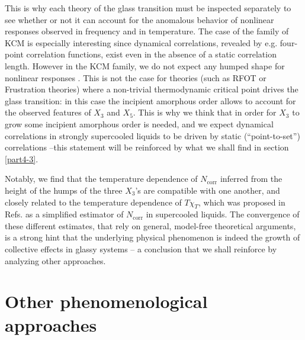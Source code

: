 \documentclass[single column,pre]{revtex4}
\begin{document}
This is why each theory of the glass transition must be inspected separately \cite{Alb16} to see whether or not it can account for the anomalous behavior of nonlinear responses observed in frequency and in temperature. The case of the family of KCM  is especially interesting since dynamical correlations, revealed by e.g. four-point correlation functions, exist even in the absence of a static correlation length. However in the KCM family, we do not expect any humped shape for nonlinear responses \cite{Alb16}. This is not the case for theories (such as RFOT or Frustration theories) where a non-trivial thermodynamic critical point drives the glass transition: in this case the incipient amorphous order allows to account \cite{Alb16} for the observed features of $X_3$ and $X_5$. This is why we think that in order for $X_3$ to grow some incipient amorphous order is needed, and we expect dynamical correlations in strongly supercooled liquids to be driven by static (``point-to-set'') correlations \cite{note12} --this statement will be reinforced by what we shall find in section \ref{part4-3}. 


Notably, we find that the temperature dependence of $N_{\text{corr}}$ inferred from the height of the humps of the three $X_3$'s are compatible with one another, and closely related to the temperature dependence of $T \chi_T$, which was proposed in Refs. \cite{Ber05,Dal07} as a simplified estimator of $N_{\text{corr}}$ in supercooled liquids. The convergence of these different estimates, that rely on  general, model-free theoretical arguments, is a strong hint that the underlying physical phenomenon is indeed the growth of collective effects in glassy systems -- a conclusion that we shall reinforce by analyzing other approaches.

\section{\label{part4} Other phenomenological approaches}
\end{document}
